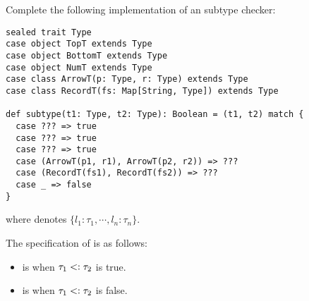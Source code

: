 \begin{exercise}

Complete the following implementation of an \lang subtype checker:

\begin{verbatim}
sealed trait Type
case object TopT extends Type
case object BottomT extends Type
case object NumT extends Type
case class ArrowT(p: Type, r: Type) extends Type
case class RecordT(fs: Map[String, Type]) extends Type

def subtype(t1: Type, t2: Type): Boolean = (t1, t2) match {
  case ??? => true
  case ??? => true
  case ??? => true
  case (ArrowT(p1, r1), ArrowT(p2, r2)) => ???
  case (RecordT(fs1), RecordT(fs2)) => ???
  case _ => false
}
\end{verbatim}

where 
denotes $\{l_1:\tau_1,\cdots,l_n:\tau_n\}$.

The specification of  is as follows:
\begin{itemize}
  \item {} is  when $\tau_1<:\tau_2$
    is true.
  \item {} is  when $\tau_1<:\tau_2$
    is false.
\end{itemize}

\end{exercise}

